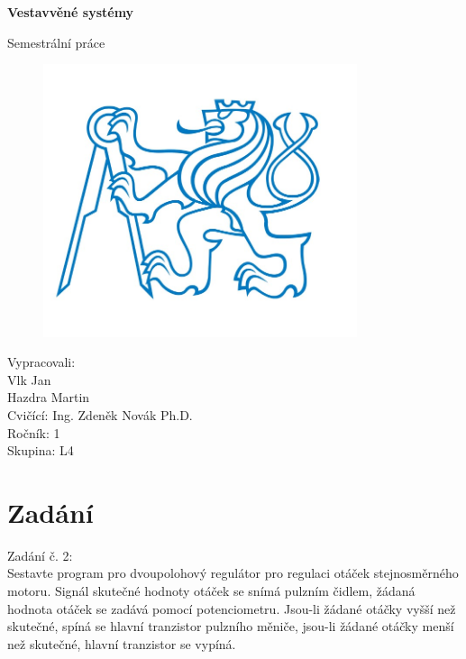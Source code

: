 \documentclass[12pt,a4paper]{article}
\begin{document}
	\begin{titlepage}
		\begin{center}
			\vspace{5cm}
			
			\Huge
			\textbf{Vestavvěné systémy}
			
			\vspace{0.5cm}
			\LARGE
			Semestrální práce
			
			\vspace{1.5cm}
			\begin{figure}[h]
				\centering
				\includegraphics[height=8cm]{logo}

			\end{figure}
			
			\vfill
			
			
			\vspace{0.8cm}			
			
		\end{center}
		\begin{flushleft}
			Vypracovali:\\ 
			\hspace{1cm}Vlk Jan \\
			\hspace{1cm}Hazdra Martin \\
			
			Cvičící: Ing. Zdeněk Novák Ph.D.\\
			Ročník: 1\\
			Skupina: L4\\
			
		\end{flushleft}
	\end{titlepage}
	

\newpage

\section*{Zadání}
Zadání č. 2:\\
Sestavte program pro dvoupolohový regulátor pro regulaci otáček stejnosměrného motoru. Signál skutečné hodnoty otáček se snímá pulzním čidlem, žádaná hodnota otáček se zadává pomocí potenciometru. Jsou-li žádané otáčky vyšší než skutečné, spíná se hlavní tranzistor pulzního měniče, jsou-li žádané otáčky menší než skutečné, hlavní tranzistor se vypíná.
\end{document}

